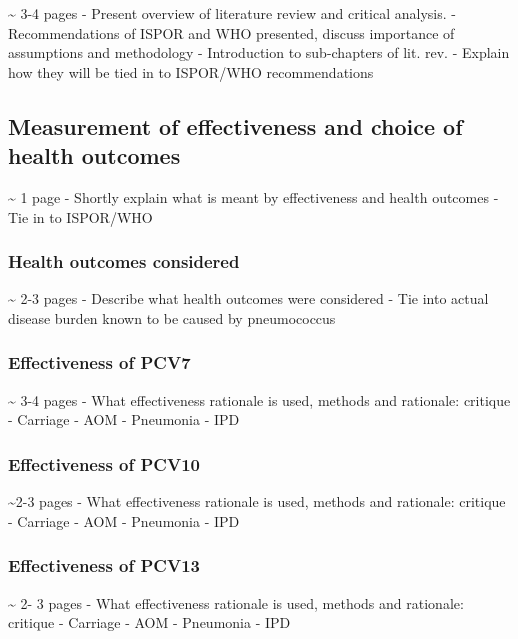 \documentclass[]{book}
\theoremstyle{definition}
\theoremstyle{definition}
\theoremstyle{definition}
\theoremstyle{remark}
\begin{document}
\textasciitilde{} 3-4 pages - Present overview of literature review and
critical analysis. - Recommendations of ISPOR and WHO presented, discuss
importance of assumptions and methodology - Introduction to sub-chapters
of lit. rev. - Explain how they will be tied in to ISPOR/WHO
recommendations

\subsection{Measurement of effectiveness and choice of health
outcomes}\label{measurement-of-effectiveness-and-choice-of-health-outcomes}

\textasciitilde{} 1 page - Shortly explain what is meant by
effectiveness and health outcomes - Tie in to ISPOR/WHO

\subsubsection{Health outcomes
considered}\label{health-outcomes-considered}

\textasciitilde{} 2-3 pages - Describe what health outcomes were
considered - Tie into actual disease burden known to be caused by
pneumococcus

\subsubsection{Effectiveness of PCV7}\label{effectiveness-of-pcv7}

\textasciitilde{} 3-4 pages - What effectiveness rationale is used,
methods and rationale: critique - Carriage - AOM - Pneumonia - IPD

\subsubsection{Effectiveness of PCV10}\label{effectiveness-of-pcv10}

\textasciitilde{}2-3 pages - What effectiveness rationale is used,
methods and rationale: critique - Carriage - AOM - Pneumonia - IPD

\subsubsection{Effectiveness of PCV13}\label{effectiveness-of-pcv13}

\textasciitilde{} 2- 3 pages - What effectiveness rationale is used,
methods and rationale: critique - Carriage - AOM - Pneumonia - IPD
\end{document}
